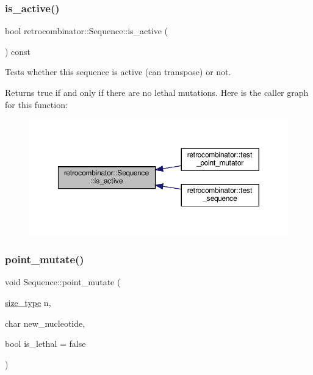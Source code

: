 \subsubsection{\texorpdfstring{is\+\_\+active()}{is\_active()}}
{\footnotesize\ttfamily bool retrocombinator\+::\+Sequence\+::is\+\_\+active (\begin{DoxyParamCaption}{ }\end{DoxyParamCaption}) const\hspace{0.3cm}{\ttfamily [inline]}}



Tests whether this sequence is active (can transpose) or not. 

Returns true if and only if there are no lethal mutations. Here is the caller graph for this function\+:
\nopagebreak
\begin{figure}[H]
\begin{center}
\leavevmode
\includegraphics[width=350pt]{classretrocombinator_1_1Sequence_a445120376c2e5c626d3ecfa509406843_icgraph}
\end{center}
\end{figure}
\mbox{\label{classretrocombinator_1_1Sequence_a85299c3dbf2efb993a43acc2e42fcb00}} 
\subsubsection{\texorpdfstring{point\+\_\+mutate()}{point\_mutate()}}
{\footnotesize\ttfamily void Sequence\+::point\+\_\+mutate (\begin{DoxyParamCaption}\item[{\hyperlink{namespaceretrocombinator_a8e1541b50cee66a791df4c437ccbb385}{size\+\_\+type}}]{n,  }\item[{char}]{new\+\_\+nucleotide,  }\item[{bool}]{is\+\_\+lethal = {\ttfamily false} }\end{DoxyParamCaption})}




